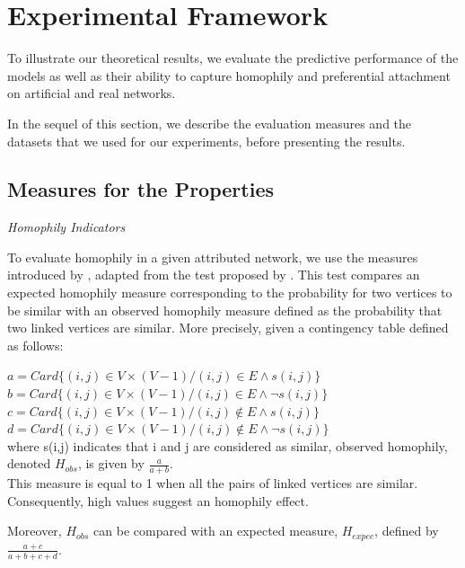 \section{Experimental Framework}
\label{sec:experiments}


To illustrate our theoretical results, we evaluate the predictive performance of the models as well as their ability  to capture homophily and preferential attachment on artificial and real networks.  

In the sequel of this section, we describe the evaluation measures and the datasets that we used for our experiments, before presenting the results.







\subsection{Measures for the Properties}

\textit{Homophily Indicators}

To evaluate homophily in a given attributed network, we use the measures introduced by \cite{largeron2015}, adapted from the test proposed by \cite{Easley2010}.  This test compares an expected homophily measure corresponding to the probability for two vertices to be similar with an observed homophily measure defined as the probability that two linked vertices are similar. More precisely, given a contingency table defined as follows:

$a = Card\{(i,j)\in V\times (V-1) / (i,j) \in E \land s(i,j)\}$\\
$b = Card\{(i,j)\in V\times (V-1) / (i,j) \in E \land \neg{s(i,j)}\}$\\ 
$c = Card\{(i,j)\in V\times (V-1) / (i,j) \notin E \land s(i,j)\}$\\
$d = Card\{(i,j)\in V\times (V-1) / (i,j) \notin E \land \neg{s(i,j)}\}$\\

where  s(i,j) indicates that i and j are considered as similar, observed homophily, denoted $H_{obs}$, is given by $\frac{a}{a+b}$.\\
This measure  is equal to 1 when all the pairs of linked vertices are similar. Consequently, high values suggest an homophily effect.

Moreover, $H_{obs}$ can be compared with an expected measure, $H_{expec}$, defined by  $ \frac{a+c}{a+b+c+d}$.\\

